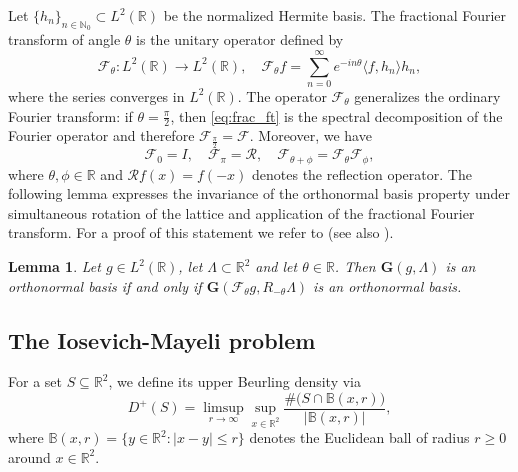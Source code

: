 \documentclass[reqno,a4paper,12pt]{amsart}
\numberwithin{equation}{section}
\newtheorem{lemma}[definition]{Lemma}
\def\N{{\mathbb N}}
\def\R{{\mathbb R}}
\newcommand{\lt}{{L^2(\R)}}
\newcommand{\ft}{{\mathcal{F}}}
\newcommand\1{\mathds{1}}
\begin{document}
Let $\{ h_n \}_{n \in \N_0} \subset \lt$ be the normalized Hermite basis. The fractional Fourier transform of angle \(\theta\) is the unitary operator defined by
\begin{equation}\label{eq:frac_ft}
\ft_\theta : \lt \to \lt, \quad    \mathcal F_\theta f = \sum_{n=0}^{\infty} e^{-in\theta}\langle f,h_n\rangle h_n,
\end{equation}
where the series converges in \(L^2(\mathbb R)\). The operator $\ft_\theta$ generalizes the ordinary Fourier transform: if $\theta = \frac \pi 2$, then \eqref{eq:frac_ft} is the spectral decomposition of the Fourier operator and therefore $\ft_{\frac \pi 2} = \ft$.
Moreover, we have
\[
\mathcal F_0=I,
\quad
\mathcal F_\pi = \mathcal{R},
\quad
\mathcal F_{\theta+\phi}
=
\mathcal F_\theta\mathcal F_\phi,
\]
where $\theta, \phi \in \R$ and $\mathcal{R}f(x) = f(-x)$ denotes the reflection operator.
The following lemma expresses the invariance of the orthonormal basis property under simultaneous rotation of the lattice and application of the fractional Fourier transform. For a proof of this statement we refer to \cite{folland} (see also \cite[Chapter 9]{Groechenig}).

\begin{lemma}\label{lma:frac_invariance}
Let $g \in \lt$, let $\Lambda \subset \R^2$ and let $\theta \in \R$. Then $\mathbf G(g,\Lambda)$ is an orthonormal basis if and only if $\mathbf G(\mathcal F_\theta g,R_{-\theta}\Lambda)$ is an orthonormal basis.
\end{lemma}

\subsection{The Iosevich-Mayeli problem}

For a set $S \subseteq \R^2$, we define its upper Beurling density via
$$
D^+(S)
=
\limsup_{r\to\infty}
\sup_{x\in\mathbb R^2}
\frac{\#\bigl(S \cap \mathbb{B}(x,r)\bigr)}{|\mathbb{B}(x,r)|},
$$
where $\mathbb{B}(x,r) = \{ y \in \R^2 : |x-y| \leq r \}$ denotes the Euclidean ball of radius $r \geq 0$ around $x \in \R^2$.
\end{document}
